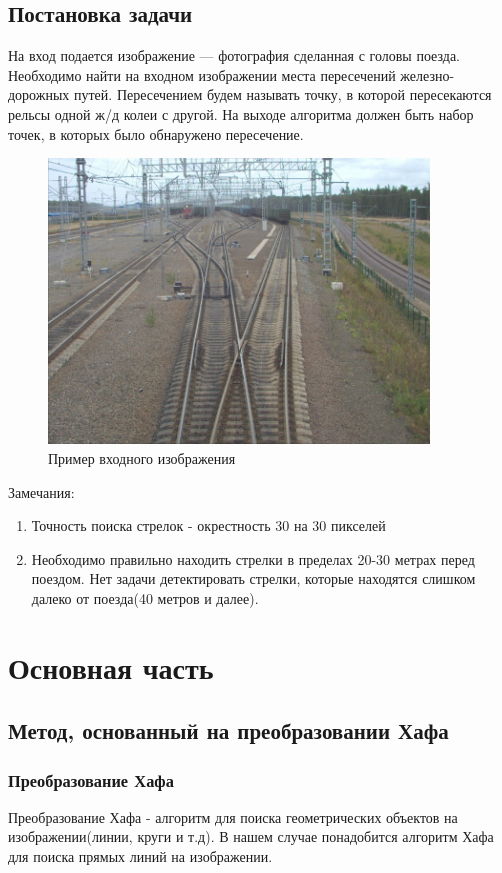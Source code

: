 \newpage
\subsection{Постановка задачи}
На вход подается изображение — фотография сделанная с головы поезда. Необходимо найти на входном изображении места пересечений железно-дорожных путей. Пересечением будем называть точку, в которой пересекаются рельсы одной ж/д колеи с другой. На выходе алгоритма должен быть набор точек, в которых было обнаружено пересечение.

\begin{figure}[!h]
	\centering
	\includegraphics[width=0.9\textwidth]{pictures/img0002.jpg} 
	\caption{Пример входного изображения}
	\label{fig:input}
\end{figure}

\newpage
Замечания: 
\begin{enumerate}
	\item Точность поиска стрелок - окрестность 30 на 30 пикселей
	\item Необходимо правильно находить стрелки в пределах 20-30 метрах перед поездом. Нет задачи детектировать стрелки, которые находятся слишком далеко от поезда(40 метров и далее).
\end{enumerate}


\section{Основная часть}
\subsection{Метод, основанный на преобразовании Хафа}
\subsubsection{Преобразование Хафа}
\label{hough}
Преобразование Хафа \cite{b:hough_transform} - алгоритм для поиска геометрических объектов на изображении(линии, круги и т.д). В нашем случае понадобится алгоритм Хафа для поиска прямых линий на изображении. 

